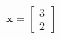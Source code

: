 \documentclass[preview]{standalone}
\begin{document}
\begin{center}
$\mathbf{x} = \begin{bmatrix} 3 \\ 2 \end{bmatrix}$
\end{center}
\end{document}
